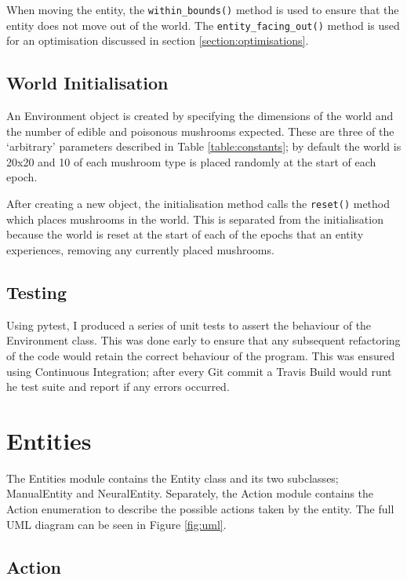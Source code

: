 \documentclass[12pt,a4paper,twoside,openright]{report}
\begin{document}
When moving the entity, the \texttt{within\_bounds()} method is used to ensure that the entity does not move out of the world. The \texttt{entity\_facing\_out()} method is used for an optimisation discussed in section \ref{section:optimisations}.

\subsection{World Initialisation}

An Environment object is created by specifying the dimensions of the world and the number of edible and poisonous mushrooms expected. These are three of the `arbitrary' parameters described in Table \ref{table:constants}; by default the world is 20x20 and 10 of each mushroom type is placed randomly at the start of each epoch.

After creating a new object, the initialisation method calls the \texttt{reset()} method which places mushrooms in the world. This is separated from the initialisation because the world is reset at the start of each of the epochs that an entity experiences, removing any currently placed mushrooms.

\subsection{Testing}

Using pytest, I produced a series of unit tests to assert the behaviour of the Environment class. This was done early to ensure that any subsequent refactoring of the code would retain the correct behaviour of the program. This was ensured using Continuous Integration; after every Git commit a Travis Build would runt he test suite and report if any errors occurred.

\section{Entities}

The Entities module contains the Entity class and its two subclasses; ManualEntity and NeuralEntity. Separately, the Action module contains the Action enumeration to describe the possible actions taken by the entity. The full UML diagram can be seen in Figure \ref{fig:uml}.

\subsection{Action}
\end{document}

